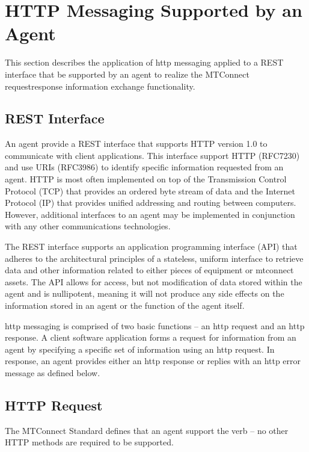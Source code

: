 \section{HTTP Messaging Supported by an Agent}

This section describes the application of \gls{http messaging} applied to a REST interface that \MUST be supported by an \gls{agent} to realize the MTConnect \gls{requestresponse} information exchange functionality.

\subsection{REST Interface}

An \gls{agent} \MUST provide a REST interface that supports HTTP version 1.0 to communicate with client applications.  This interface \MUST support HTTP (RFC7230) and use URIs (RFC3986) to identify specific information requested from an \gls{agent}.  HTTP is most often implemented on top of the Transmission Control Protocol (TCP) that provides an ordered byte stream of data and the Internet Protocol (IP) that provides unified addressing and routing between computers.  However, additional interfaces to an \gls{agent} may be implemented in conjunction with any other communications technologies.

The REST interface supports an \gls{application programming interface} (API) that adheres to the architectural principles of a stateless, uniform interface to retrieve data and other information related to either pieces of equipment or \glspl{mtconnect asset}.  The API allows for access, but not modification of data stored within the \gls{agent} and is nullipotent, meaning it will not produce any side effects on the information stored in an \gls{agent} or the function of the \gls{agent} itself.

\gls{http messaging} is comprised of two basic functions -- an \gls{http request} and an \gls{http response}.  A client software application forms a \gls{request} for information from an \gls{agent} by specifying a specific set of information using an \gls{http request}.  In response, an \gls{agent} provides either an \gls{http response} or replies with an \gls{http error message} as defined below. 

\subsection{HTTP Request}

The MTConnect Standard defines that an \gls{agent} \MUST support the  verb -- no other HTTP methods are required to be supported.

